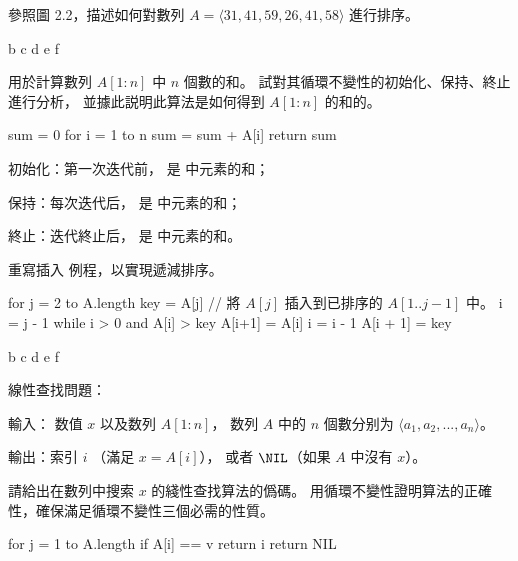 \startsection[
  title={Insertion sort},,
  reference=section:insersion_sort,
]

\startEXERCISE
參照圖 2.2，描述如何對數列 $A = \langle 31, 41, 59, 26, 41, 58\rangle$ 進行排序。
\stopEXERCISE

\startANSWER
{}
{\externalfigure[e2_1_1-2]}{b}
{\externalfigure[e2_1_1-3]}{c}
{\externalfigure[e2_1_1-4]}{d}
{\externalfigure[e2_1_1-5]}{e}
{\externalfigure[e2_1_1-6]}{f}
\stopcombination
\stopANSWER

\startEXERCISE
{} 用於計算數列 $A[1:n]$ 中 $n$ 個數的和。
試對其循環不變性的初始化、保持、終止進行分析，
並據此説明此算法是如何得到 $A[1:n]$ 的和的。

\startCLRSCODE
sum = 0
for i = 1 to n
	sum = sum + A[i]
return sum
\stopCLRSCODE
\stopEXERCISE

\startANSWER
\startigBase
\item 初始化：第一次迭代前，  是  中元素的和；
\item 保持：每次迭代后，  是  中元素的和；
\item 終止：迭代終止后，  是  中元素的和。
\stopigBase
\stopANSWER

\startEXERCISE
重寫插入 例程，以實現遞減排序。
\stopEXERCISE
\startANSWER

\startCLRSCODE
for j = 2 to A.length
	key = A[j]
	// 將 $A[j]$ 插入到已排序的 $A[1 .. j-1]$ 中。
	i = j - 1
	while i > 0 and A[i] > key
		A[i+1] = A[i]
		i = i - 1
	A[i + 1] = key
\stopCLRSCODE

{\externalfigure[e2_1_2-2]}{b}
{\externalfigure[e2_1_2-3]}{c}
{\externalfigure[e2_1_2-4]}{d}
{\externalfigure[e2_1_2-5]}{e}
{\externalfigure[e2_1_2-6]}{f}
\stopcombination
\stopANSWER

線性查找問題：

輸入： 数值 $x$ 以及数列 $A[1:n]$，
数列 $A$ 中的 $n$ 個數分别为 $\langle a_1, a_2, ..., a_n \rangle$。

輸出：索引 $i$ （滿足 $x = A[i]$），
或者 $\NIL$（如果 $A$ 中沒有 $x$）。

請給出在數列中搜索 $x$ 的綫性查找算法的僞碼。
用循環不變性證明算法的正確性，確保滿足循環不變性三個必需的性質。
\stopEXERCISE

\startANSWER
\startCLRSCODE
for j = 1 to A.length
	if A[i] == v
		return i
return NIL
\stopCLRSCODE
\stopANSWER

